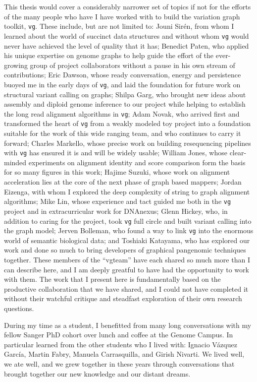 \begin{acknowledgements}
  This thesis would cover a considerably narrower set of topics if not for the efforts of the many people who have I have worked with to build the variation graph toolkit, {\tt vg}.
  These include, but are not limited to:
  Jouni Sir\'{e}n, from whom I learned about the world of succinct data structures and without whom {\tt vg} would never have achieved the level of quality that it has;
  Benedict Paten, who applied his unique expertise on genome graphs to help guide the effort of the ever-growing group of project collaborators without a pause in his own stream of contributions;
  Eric Dawson, whose ready conversation, energy and persistence buoyed me in the early days of {\tt vg}, and laid the foundation for future work on structural variant calling on graphs;
  Shilpa Garg, who brought new ideas about assembly and diploid genome inference to our project while helping to establish the long read alignment algorithms in {\tt vg};
  Adam Novak, who arrived first and transformed the heart of {\tt vg} from a weakly modeled toy project into a foundation suitable for the work of this wide ranging team, and who continues to carry it forward;
  Charles Markello, whose precise work on building resequencing pipelines with {\tt vg} has ensured it is and will be widely usable;
  William Jones, whose clear-minded experiments on alignment identity and score comparison form the basis for so many figures in this work;
  Hajime Suzuki, whose work on alignment acceleration lies at the core of the next phase of graph based mappers;
  Jordan Eizenga, with whom I explored the deep complexity of string to graph alignment algorithms;
  Mike Lin, whose experience and tact guided me both in the {\tt vg} project and in extracurricular work for DNAnexus;
  Glenn Hickey, who, in addition to caring for the project, took {\tt vg} full circle and built variant calling into the graph model;
  Jerven Bolleman, who found a way to link {\tt vg} into the enormous world of semantic biological data;
  and Toshiaki Katayama, who has explored our work and done so much to bring developers of graphical pangenomic techniques together.
  These members of the ``vgteam'' have each shared so much more than I can describe here, and I am deeply greatful to have had the opportunity to work with them.
  The work that I present here is fundamentally based on the productive collaboration that we have shared, and I could not have completed it without their watchful critique and steadfast exploration of their own research questions.

  During my time as a student, I benefitted from many long conversations with my fellow Sanger PhD cohort over lunch and coffee at the Genome Campus.
  In particular learned from the other students who I lived with: Ignacio V\'{a}zquez Garc\'{i}a, Martin Fabry, Manuela Carrasquilla, and Girish Nivarti.
  We lived well, we ate well, and we grew together in these years through conversations that brought together our new knowledge and our distant dreams.


\end{acknowledgements}

